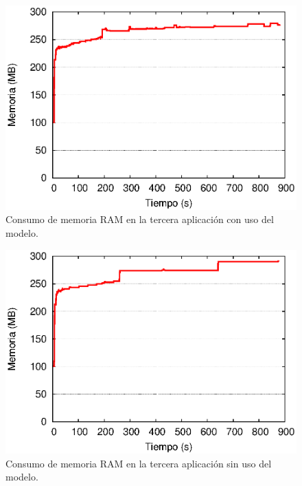 \begin{figure}[!ht]
\centering
    \includegraphics[scale=0.75]{images/exp/app3/cm/fisical/consumeRAM.eps}
    \caption{Consumo de memoria RAM en la tercera aplicaci\'on con uso del modelo.}
    \label{fig:app3-consumeRAM-cm}
\end{figure}

\begin{figure}[!ht]
\centering
    \includegraphics[scale=0.75]{images/exp/app3/sm/fisical/consumeRAM.eps}
    \caption{Consumo de memoria RAM en la tercera aplicaci\'on sin uso del modelo.}
    \label{fig:app3-consumeRAM-sm}
\end{figure}


